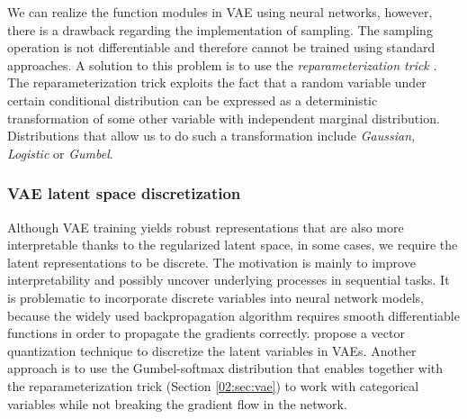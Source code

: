 We can realize the function modules in VAE using neural networks, however, there is a drawback regarding the implementation of sampling.
The sampling operation is not differentiable and therefore cannot be trained using standard approaches.
A solution to this problem is to use the \textit{reparameterization trick} \cite{kingma2013auto}.
The reparameterization trick exploits the fact that a random variable under certain conditional distribution can be expressed as a deterministic transformation of some other variable with independent marginal distribution.
Distributions that allow us to do such a transformation include \textit{Gaussian, Logistic} or \textit{Gumbel}.

\subsubsection{VAE latent space discretization}
\label{02:sec:vae_discrete}
Although VAE training yields robust representations that are also more interpretable thanks to the regularized latent space, in some cases, we require the latent representations to be discrete.
The motivation is mainly to improve interpretability and possibly uncover underlying processes in sequential tasks.
It is problematic to incorporate discrete variables into neural network models, because the widely used backpropagation algorithm requires smooth differentiable functions in order to propagate the gradients correctly.
\citet{van2017neural} propose a vector quantization technique to discretize the latent variables in VAEs.
Another approach is to use the Gumbel-softmax distribution \cite{jang2016categorical} that enables together with the reparameterization trick (Section \ref{02:sec:vae}) to work with categorical variables while not breaking the gradient flow in the network.

